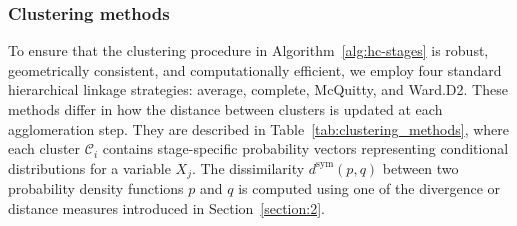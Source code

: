 \documentclass[preprint,12pt]{elsarticle}
\begin{document}
    
    








\subsubsection{Clustering methods}

To ensure that the clustering procedure in Algorithm~\ref{alg:hc-stages} is robust, geometrically consistent, and computationally efficient, we employ four standard hierarchical linkage strategies: average, complete, McQuitty, and Ward.D2. These methods differ in how the distance between clusters is updated at each agglomeration step.
They are described in Table~\ref{tab:clustering_methods}, where each cluster \( \mathcal{C}_i \) contains stage-specific probability vectors representing conditional distributions for a variable \(X_j\). The dissimilarity \( d^{\mathrm{sym}} (p,q)\) between two probability density functions \(p\) and \(q\) is computed using one of the divergence or distance measures introduced in Section~\ref{section:2}. 
\end{document}
